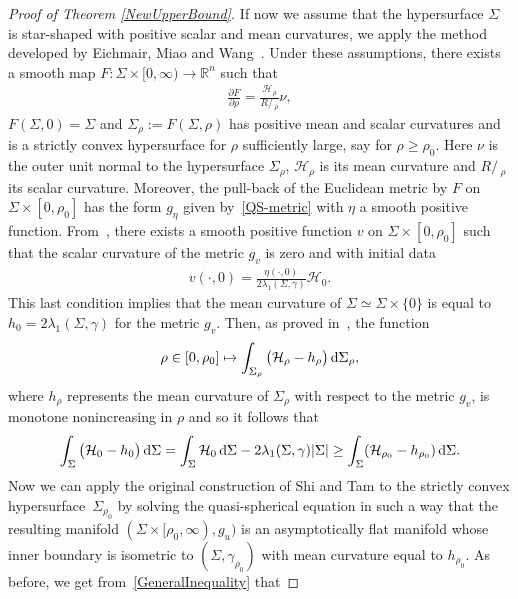 \documentclass[10pt,a4paper]{amsart}
\numberwithin{equation}{section}
\def\Ss{R\!\!\!\!/\,}
\begin{document}
\begin{proof}[Proof of Theorem \ref{NewUpperBound}]
If now we assume that the hypersurface $\Sigma$ is star-shaped with positive scalar and mean curvatures, we apply the method developed by Eichmair, Miao and Wang~\cite{EichmairMiaoWang}. Under these assumptions, there exists a smooth map $F\colon\Sigma\times[0,\infty)\rightarrow \mathbb{R}^n$ such that
\begin{gather*}
\frac{\partial F}{\partial \rho}=\frac{\mathcal{H}_\rho}{\Ss_\rho}\nu,
\end{gather*}
$F(\Sigma,0)=\Sigma$ and $\Sigma_\rho:=F(\Sigma,\rho)$ has positive mean and scalar curvatures and is a strictly convex hypersurface for $\rho$ sufficiently large, say for $\rho\geq \rho_0$. Here $\nu$ is the outer unit normal to the hypersurface $\Sigma_\rho$, $\mathcal{H}_\rho$ is its mean curvature and $\Ss_\rho$ its scalar curvature. Moreover, the pull-back of the Euclidean metric by $F$ on $\Sigma\times[0,\rho_0]$ has the form $g_\eta$ given by~\eqref{QS-metric} with $\eta$ a smooth positive function. From~\cite[Proposition 2]{EichmairMiaoWang}, there exists a smooth positive function $v$ on $\Sigma\times [0,\rho_0]$ such that the scalar curvature of the metric $g_v$
is zero and with initial data
\begin{gather*}
v(\cdot,0)=\frac{\eta(\cdot,0)}{2\lambda_1(\Sigma,\gamma)}\mathcal{H}_0.
\end{gather*}
This last condition implies that the mean curvature of $\Sigma\simeq\Sigma\times\{0\}$ is equal to $h_0=2\lambda_1(\Sigma,\gamma)$ for the metric $g_v$.
Then, as proved in~\cite[Proposition~3]{EichmairMiaoWang}, the function
\begin{gather*}
\rho\in[0,\rho_0]\mapsto\int_{\Sigma_\rho}\big(\mathcal{H}_\rho-h_\rho\big)\,{\rm d}\Sigma_\rho,
\end{gather*}
where $h_\rho$ represents the mean curvature of $\Sigma_\rho$ with respect to the metric $g_v$, is monotone nonincreasing in $\rho$ and so it follows that
\begin{gather}\label{Monotone1}
\int_{\Sigma}\big(\mathcal{H}_0-h_0\big)\,{\rm d}\Sigma=\int_{\Sigma}\mathcal{H}_0\,{\rm d}\Sigma-2\lambda_1(\Sigma,\gamma)|\Sigma| \geq \int_{\Sigma}(\mathcal{H}_{\rho_0}-h_{\rho_0})\,{\rm d}\Sigma.
\end{gather}
Now we can apply the original construction of Shi and Tam to the strictly convex hypersurface~$\Sigma_{\rho_0}$ by solving the quasi-spherical equation in such a way that the resulting manifold $(\Sigma\times[\rho_0,\infty),g_u)$ is an asymptotically flat manifold whose inner boundary is isometric to $(\Sigma,\gamma_{\rho_0})$ with mean curvature equal to $h_{\rho_0}$. As before, we get from~\eqref{GeneralInequality} that

\end{proof}
\end{document}
